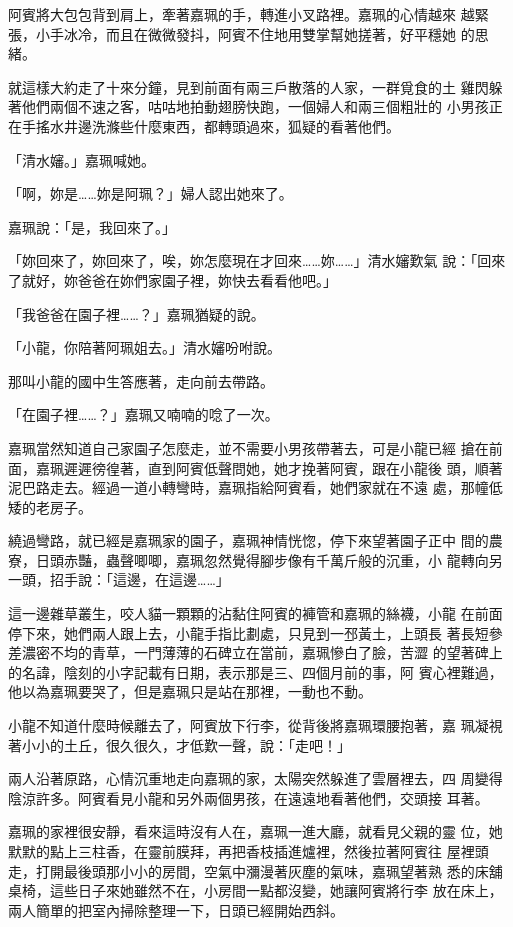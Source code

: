 阿賓將大包包背到肩上，牽著嘉珮的手，轉進小叉路裡。嘉珮的心情越來
越緊張，小手冰冷，而且在微微發抖，阿賓不住地用雙掌幫她搓著，好平穩她
的思緒。

就這樣大約走了十來分鐘，見到前面有兩三戶散落的人家，一群覓食的土
雞閃躲著他們兩個不速之客，咕咕地拍動翅膀快跑，一個婦人和兩三個粗壯的
小男孩正在手搖水井邊洗滌些什麼東西，都轉頭過來，狐疑的看著他們。

「清水嬸。」嘉珮喊她。

「啊，妳是……妳是阿珮？」婦人認出她來了。

嘉珮說：「是，我回來了。」

「妳回來了，妳回來了，唉，妳怎麼現在才回來……妳……」清水嬸歎氣
說：「回來了就好，妳爸爸在妳們家園子裡，妳快去看看他吧。」

「我爸爸在園子裡……？」嘉珮猶疑的說。

「小龍，你陪著阿珮姐去。」清水嬸吩咐說。

那叫小龍的國中生答應著，走向前去帶路。

「在園子裡……？」嘉珮又喃喃的唸了一次。

嘉珮當然知道自己家園子怎麼走，並不需要小男孩帶著去，可是小龍已經
搶在前面，嘉珮遲遲徬徨著，直到阿賓低聲問她，她才挽著阿賓，跟在小龍後
頭，順著泥巴路走去。經過一道小轉彎時，嘉珮指給阿賓看，她們家就在不遠
處，那幢低矮的老房子。

繞過彎路，就已經是嘉珮家的園子，嘉珮神情恍惚，停下來望著園子正中
間的農寮，日頭赤豔，蟲聲唧唧，嘉珮忽然覺得腳步像有千萬斤般的沉重，小
龍轉向另一頭，招手說：「這邊，在這邊……」

這一邊雜草叢生，咬人貓一顆顆的沾黏住阿賓的褲管和嘉珮的絲襪，小龍
在前面停下來，她們兩人跟上去，小龍手指比劃處，只見到一邳黃土，上頭長
著長短參差濃密不均的青草，一門薄薄的石碑立在當前，嘉珮慘白了臉，苦澀
的望著碑上的名諱，陰刻的小字記載有日期，表示那是三、四個月前的事，阿
賓心裡難過，他以為嘉珮要哭了，但是嘉珮只是站在那裡，一動也不動。

小龍不知道什麼時候離去了，阿賓放下行李，從背後將嘉珮環腰抱著，嘉
珮凝視著小小的土丘，很久很久，才低歎一聲，說：「走吧！」

兩人沿著原路，心情沉重地走向嘉珮的家，太陽突然躲進了雲層裡去，四
周變得陰涼許多。阿賓看見小龍和另外兩個男孩，在遠遠地看著他們，交頭接
耳著。

嘉珮的家裡很安靜，看來這時沒有人在，嘉珮一進大廳，就看見父親的靈
位，她默默的點上三柱香，在靈前膜拜，再把香枝插進爐裡，然後拉著阿賓往
屋裡頭走，打開最後頭那小小的房間，空氣中瀰漫著灰塵的氣味，嘉珮望著熟
悉的床舖桌椅，這些日子來她雖然不在，小房間一點都沒變，她讓阿賓將行李
放在床上，兩人簡單的把室內掃除整理一下，日頭已經開始西斜。

